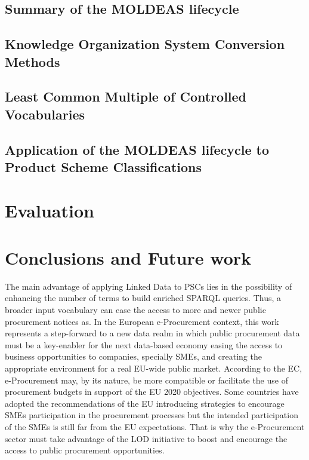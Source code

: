 \documentclass[preprint,12pt]{elsarticle}
\begin{document}
  \subsection{Summary of the MOLDEAS lifecycle}\label{sect:method}
  
  \subsection{Knowledge Organization System Conversion Methods}\label{sect:thesauri}
  
  \subsection{Least Common Multiple of Controlled Vocabularies}\label{sect:least}
  
  \subsection{Application of the MOLDEAS lifecycle to Product Scheme Classifications}\label{sect:use-moldeas}
  

\clearpage
\section{Evaluation}\label{sect:evaluation}

\newpage
\section{Conclusions and Future work}\label{sect:conclusions}
The main advantage of applying Linked Data to PSCs lies in the possibility of enhancing the number of terms to 
build enriched SPARQL queries. Thus, a broader input vocabulary can ease the access to more and newer 
public procurement notices as. In the European e-Procurement context, this work represents 
a step-forward to a new data realm in which public procurement data must be a key-enabler for the next 
data-based economy easing the access to business opportunities to companies, specially SMEs, 
and creating the appropriate environment for a real EU-wide public market. According to the EC, e-Procurement may, 
by its nature, be more compatible or facilitate the use of procurement budgets in support of the 
EU 2020 objectives. Some countries have adopted the recommendations of the EU introducing strategies to encourage SMEs 
participation in the procurement processes but the intended participation of the SMEs is still far from the EU expectations. 
That is why the e-Procurement sector must take advantage of the LOD initiative to boost and encourage 
the access to public procurement opportunities.
\end{document}
